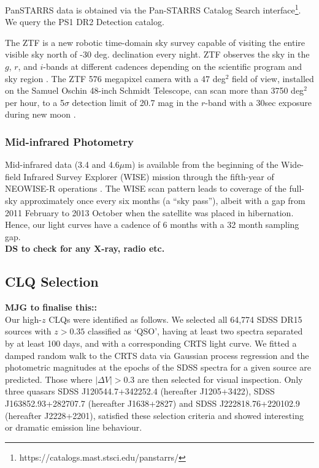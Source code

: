 \documentclass[a4paper,fleqn,usenatbib]{mnras}
\begin{document}
PanSTARRS data is obtained via the Pan-STARRS Catalog Search
interface\footnote{https://catalogs.mast.stsci.edu/panstarrs/}.
We query the PS1 DR2 Detection catalog.

The ZTF is a new robotic time-domain sky survey capable of visiting
the entire visible sky north of -30 deg. declination every night. ZTF
observes the sky in the $g$, $r$, and $i$-bands at different cadences
depending on the scientific program and sky region
\citep{Bellm2019_ZTFSurveys, Graham2019_ZTF}. The ZTF 576 megapixel
camera with a 47 deg$^{2}$ field of view, installed on the Samuel
Oschin 48-inch Schmidt Telescope, can scan more than 3750 deg$^{2}$
per hour, to a 5$\sigma$ detection limit of 20.7 mag in the $r$-band
with a 30sec exposure during new moon \citep{Masci2019}.


\subsubsection{Mid-infrared Photometry}
Mid-infrared data (3.4 and 4.6$\mu$m) is available from the beginning
of the Wide-field Infrared Survey Explorer (WISE) mission \citep[2010
January; ][]{Wright2010} through the fifth-year of NEOWISE-R
operations \citep[2018 December; ][]{Mainzer2011}. The WISE scan
pattern leads to coverage of the full-sky approximately once every six
months (a ``sky pass''), albeit with a gap from 2011 February to 2013
October when the satellite was placed in hibernation.  Hence, our
light curves have a cadence of 6 months with a 32 month sampling
gap. \\
{\bf DS to check for any X-ray, radio etc.} 


\subsection{CLQ Selection}
{\bf MJG to finalise this::} \\
Our high-$z$ CLQs were identified as follows.  We selected all 64,774
SDSS DR15 sources with $z > 0.35$ classified as `QSO', having at least
two spectra separated by at least 100 days, and with a corresponding
CRTS light curve. We fitted a damped random walk to the CRTS data via
Gaussian process regression and the photometric magnitudes at the
epochs of the SDSS spectra for a given source are predicted. Those
where $|\Delta V| > 0.3$ are then selected for visual
inspection. Only three quasars SDSS J120544.7+342252.4 (hereafter
J1205+3422), SDSS J163852.93+282707.7 (hereafter J1638+2827) and SDSS
J222818.76+220102.9 (hereafter J2228+2201), satisfied these selection
criteria and showed interesting or dramatic emission line behaviour.
\end{document}
